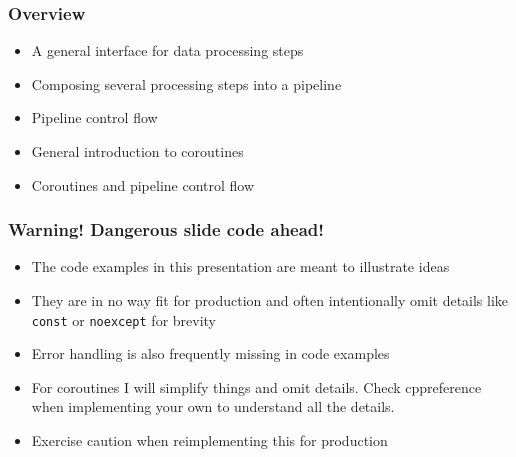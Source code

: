 \documentclass[aspectratio=169]{beamer}
\begin{document}
\begin{frame}
  \frametitle{Overview}
  \begin{itemize}
  \item A general interface for data processing steps
  \item Composing several processing steps into a pipeline
  \item Pipeline control flow
  \item General introduction to coroutines
  \item Coroutines and pipeline control flow
  \end{itemize}
\end{frame}

\begin{frame}

  \frametitle{Warning! Dangerous slide code ahead!}

  \begin{itemize}
    \item The code examples in this presentation are meant to illustrate ideas
    \item They are in no way fit for production and often intentionally omit details like \texttt{const} or \texttt{noexcept} for brevity
    \item Error handling is also frequently missing in code examples
    \item For coroutines I will simplify things and omit details. Check cppreference when implementing your own to understand all the details.
    \item Exercise caution when reimplementing this for production
  \end{itemize}
\end{frame}
\end{document}
